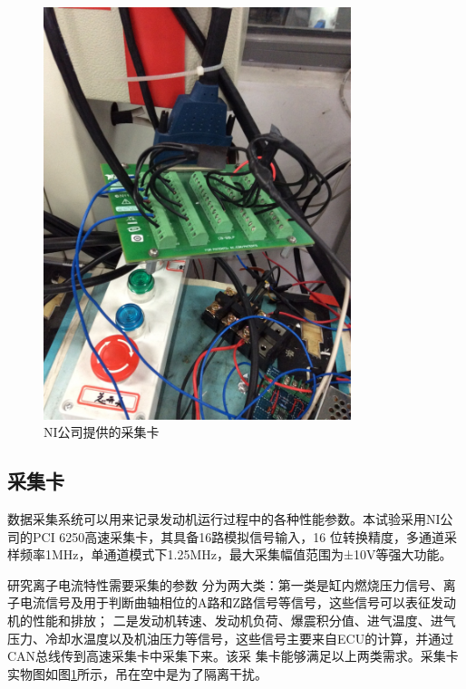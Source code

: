 \begin{figure}[ht]
\begin{minipage}[H]{0.5\linewidth}
		\includegraphics[width=0.8\textwidth]{thesis_figure/platformer_chapter/nicjk}
		\caption{NI公司提供的采集卡}
		\label{fig:nicjk}
	\end{minipage}
\end{figure}
\subsection{采集卡}
数据采集系统可以用来记录发动机运行过程中的各种性能参数。本试验采用NI公司的PCI 6250高速采集卡，其具备16路模拟信号输入，16
位转换精度，多通道采样频率1MHz，单通道模式下1.25MHz，最大采集幅值范围为±10V等强大功能。\par 研究离子电流特性需要采集的参数
分为两大类：第一类是缸内燃烧压力信号、离子电流信号及用于判断曲轴相位的A路和Z路信号等信号，这些信号可以表征发动机的性能和排放；
二是发动机转速、发动机负荷、爆震积分值、进气温度、进气压力、冷却水温度以及机油压力等信号，这些信号主要来自ECU的计算，并通过CAN总线传到高速采集卡中采集下来。该采
集卡能够满足以上两类需求。采集卡实物图如图\ref{fig:nicjk}所示，吊在空中是为了隔离干扰。
